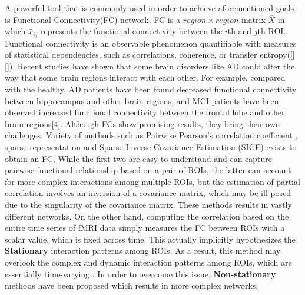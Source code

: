 \documentclass[journal]{IEEEtran}
\begin{document}
	
	
	A powerful tool that is commonly used in order to achieve aforementioned goals is Functional Connectivity(FC) network.  FC is a $region \times region$ matrix $\bar{X}$ in which $\bar{x}_{ij}$ represents the functional connectivity between the $i$th and $j$th ROI. Functional connectivity is an observable
	phenomenon quantifiable with measures of statistical dependencies, such as correlations, coherence, or transfer entropy([][]).  Recent studies have shown that some brain disorders like AD could alter the way that some brain regions interact with each other. For example, compared with the healthy, AD patients have been found decreased functional connectivity between hippocampus and other brain regions, and MCI patients have been observed increased functional connectivity between the frontal lobe and other brain regions[4]. 
	Although FCs show promising results, they bring their own challenges. Variety of methods such as Pairwise Pearson’s correlation coefficient \cite{r10, r11}, sparse representation \cite{r10, r12, r13}  and Sparse Inverse Covariance Estimation (SICE) exists to obtain an FC,
	While the first two are easy to understand and can capture pairwise functional relationship based on a pair of ROIs, the latter can account for more complex interactions among multiple ROIs, but the estimation of partial correlation involves an inversion of a covariance matrix, which may be ill-posed due to the singularity of the covariance matrix. 
	These methods results in vastly different networks. On the other hand, computing the correlation based on the entire time series of fMRI data simply measures the FC between ROIs with a scalar value, which is fixed across time. This actually implicitly hypothesizes the \textbf{Stationary} interaction patterns among ROIs. As a result, this method may overlook the complex and dynamic interaction patterns among ROIs, which are essentially time-varying \cite{r16}\textendash \cite{r19}. In order to overcome this issue, \textbf{Non-stationary} methods have been proposed which results in more complex networks.
	
\end{document}
